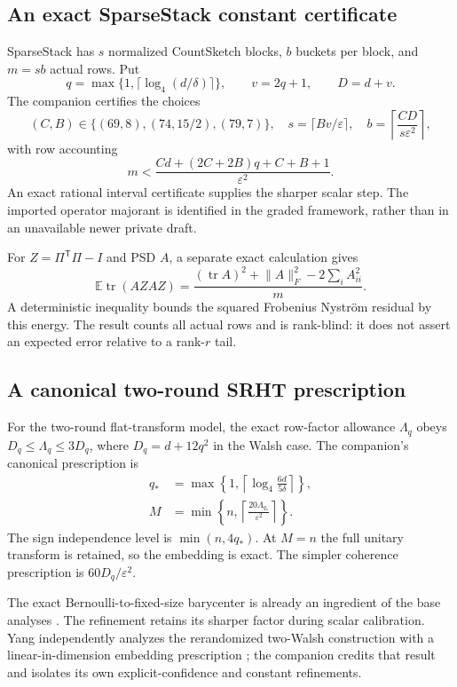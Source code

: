 \documentclass[11pt,a4paper]{article}
\newcommand{\E}{\mathbb E}
\newcommand{\tr}{\operatorname{tr}}
\newcommand{\eps}{\varepsilon}
\newcommand{\norm}[1]{\lVert#1\rVert}
\begin{document}
\subsection{An exact SparseStack constant certificate}
SparseStack has $s$ normalized CountSketch blocks, $b$ buckets per block,
and $m=sb$ actual rows. Put
\[
 q=\max\{1,\lceil\log_4(d/\delta)\rceil\},\qquad
 v=2q+1,\qquad D=d+v.
\]
The companion certifies the choices
\[
 (C,B)\in\{(69,8),(74,15/2),(79,7)\},\quad
 s=\lceil Bv/\eps\rceil,\quad
 b=\left\lceil\frac{CD}{s\eps^2}\right\rceil,
\]
with row accounting
\[
 m<\frac{Cd+(2C+2B)q+C+B+1}{\eps^2}.
\]
An exact rational interval certificate supplies the sharper scalar step.
The imported operator majorant is identified in the graded framework,
rather than in an unavailable newer private draft.

For $Z=\Pi^\mathsf T\Pi-I$ and PSD $A$, a separate exact calculation gives
\begin{equation}\label{eq:ssenergy}
 \E\tr(AZAZ)=
 \frac{(\tr A)^2+\norm A_F^2-2\sum_iA_{ii}^2}{m}.
\end{equation}
A deterministic inequality bounds the squared Frobenius Nystr\"om
residual by this energy. The result counts all actual rows and is
rank-blind: it does not assert an expected error relative to a rank-$r$
tail.

\subsection{A canonical two-round SRHT prescription}
For the two-round flat-transform model, the exact row-factor allowance
$\Lambda_q$ obeys $D_q\le\Lambda_q\le3D_q$, where $D_q=d+12q^2$ in the Walsh
case. The companion's canonical prescription is
\begin{align*}
 q_*&=\max\left\{1,\left\lceil\log_4\frac{6d}{5\delta}\right\rceil\right\},\\
 M&=\min\left\{n,\left\lceil\frac{20\Lambda_{q_*}}{\eps^2}\right\rceil\right\}.
\end{align*}
The sign independence level is $\min(n,4q_*)$. At $M=n$ the full unitary
transform is retained, so the embedding is exact. The simpler coherence
prescription is $60D_q/\eps^2$.

The exact Bernoulli-to-fixed-size barycenter is already an ingredient of
the base analyses \cite{GMO,Hybrid}. The refinement retains its sharper
factor during scalar calibration. Yang independently analyzes the
rerandomized two-Walsh construction with a linear-in-dimension embedding
prescription \cite{Yang}; the companion credits that result and isolates
its own explicit-confidence and constant refinements.
\end{document}

